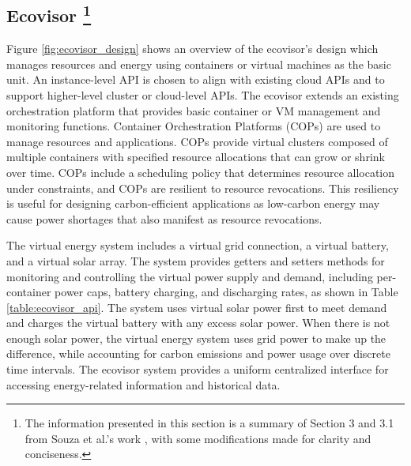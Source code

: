 \subsection[Ecovisor]{
    Ecovisor \footnote{The information presented in this section is a summary of
    Section 3 and 3.1 from Souza et al.'s work \cite{souza2023}, with some
    modifications made for clarity and conciseness.}
}

Figure \ref{fig:ecovisor_design} shows an overview of the ecovisor's design
which manages resources and energy using containers or virtual machines as the
basic unit. An instance-level API is chosen to align with existing cloud APIs
and to support higher-level cluster or cloud-level APIs. The ecovisor extends an
existing orchestration platform that provides basic container or VM management
and monitoring functions. Container Orchestration Platforms (COPs) are used to
manage resources and applications. COPs provide virtual clusters composed of
multiple containers with specified resource allocations that can grow or shrink
over time. COPs include a scheduling policy that determines resource allocation
under constraints, and COPs are resilient to resource revocations. This
resiliency is useful for designing carbon-efficient applications as low-carbon
energy may cause power shortages that also manifest as resource revocations.

The virtual energy system includes a virtual grid connection, a virtual battery,
and a virtual solar array. The system provides getters and setters methods for
monitoring and controlling the virtual power supply and demand, including
per-container power caps, battery charging, and discharging rates, as shown in
Table \ref{table:ecovisor_api}. The system uses virtual solar power first to
meet demand and charges the virtual battery with any excess solar power. When
there is not enough solar power, the virtual energy system uses grid power to
make up the difference, while accounting for carbon emissions and power usage
over discrete time intervals. The ecovisor system provides a uniform centralized
interface for accessing energy-related information and historical data.


